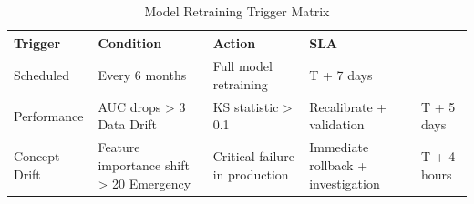 \begin{table}
\caption{Model Retraining Trigger Matrix}
\label{tab:retrain}
\begin{tabular}{llll}
\toprule
Trigger & Condition & Action & SLA \\
\midrule
Scheduled & Every 6 months & Full model retraining & T + 7 days \\
Performance & AUC drops > 3%
Data Drift & KS statistic > 0.1 & Recalibrate + validation & T + 5 days \\
Concept Drift & Feature importance shift > 20%
Emergency & Critical failure in production & Immediate rollback + investigation & T + 4 hours \\
\bottomrule
\end{tabular}
\end{table}
